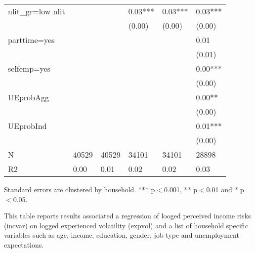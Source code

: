 \begin{table}[p]
\begin{adjustbox}{width=\textwidth}
\begin{threeparttable}
\begin{tabular}{llllll}
nlit\_gr=low nlit &          &           &    0.03*** &     0.03*** &      0.03*** \\
                 &          &           &     (0.00) &      (0.00) &       (0.00) \\
parttime=yes     &          &           &            &             &         0.01 \\
                 &          &           &            &             &       (0.01) \\
selfemp=yes      &          &           &            &             &      0.00*** \\
                 &          &           &            &             &       (0.00) \\
UEprobAgg        &          &           &            &             &       0.00** \\
                 &          &           &            &             &       (0.00) \\
UEprobInd        &          &           &            &             &      0.01*** \\
                 &          &           &            &             &       (0.00) \\
N                &    40529 &     40529 &      34101 &       34101 &        28898 \\
R2               &     0.00 &      0.01 &       0.02 &        0.02 &         0.03 \\
\bottomrule
\end{tabular}
\begin{tablenotes}\item Standard errors are clustered by household. *** p$<$0.001, ** p$<$0.01 and * p$<$0.05. 
\item This table reports results associated a regression of looged perceived income risks (incvar) on logged experienced volatility ($\text{expvol}$) and a list of household specific variables such as age, income, education, gender, job type and unemployment expectations.
\end{tablenotes}
\end{threeparttable}
\end{adjustbox}
\end{table}